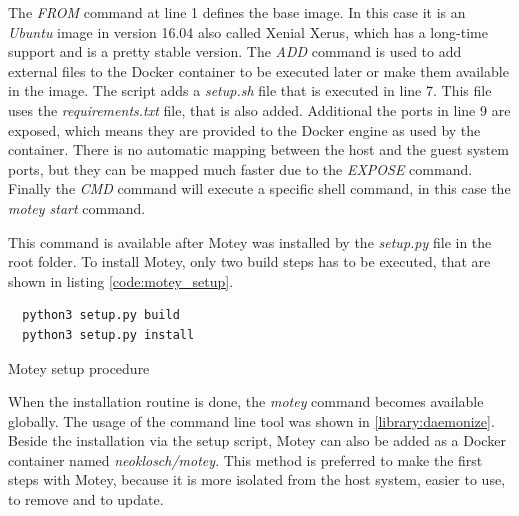 The \textit{FROM} command at line 1 defines the base image.
In this case it is an \textit{Ubuntu} image in version 16.04 also called Xenial Xerus, which has a long-time support and is a pretty stable version.
The \textit{ADD} command is used to add external files to the Docker container to be executed later or make them available in the image.
The script adds a \textit{setup.sh} file that is executed in line 7.
This file uses the \textit{requirements.txt} file, that is also added.
Additional the ports in line 9 are exposed, which means they are provided to the Docker engine as used by the container.
There is no automatic mapping between the host and the guest system ports, but they can be mapped much faster due to the \textit{EXPOSE} command.
Finally the \textit{CMD} command will execute a specific shell command, in this case the \textit{motey start} command.

This command is available after Motey was installed by the \textit{setup.py} file in the root folder.
To install Motey, only two build steps has to be executed, that are shown in listing \ref{code:motey_setup}.

\begin{listing}[H]
  \begin{verbatim}
  python3 setup.py build
  python3 setup.py install
  \end{verbatim}
  \caption{Motey setup procedure}
  \label{code:motey_setup}
\end{listing}

When the installation routine is done, the \textit{motey} command becomes available globally.
The usage of the command line tool was shown in \ref{library:daemonize}.
Beside the installation via the setup script, Motey can also be added as a Docker container named \textit{neoklosch/motey}.
This method is preferred to make the first steps with Motey, because it is more isolated from the host system, easier to use, to remove and to update.
